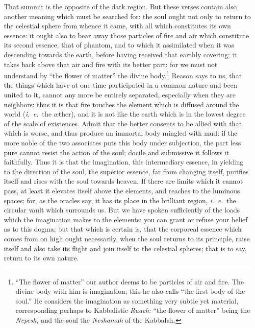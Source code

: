 \documentclass[12pt]{article}
\begin{document}
\noindent That summit is the opposite of the dark region. But these verses
contain also another meaning which must be searched for: the soul ought not
only to return to the celestial sphere from whence it came, with all which
constitutes its own essence: it ought also to bear away those particles of fire
and air which constitute its second essence, that of phantom, and to which it
assimilated when it was descending towards the earth, before having received
that earthly covering; it takes back above that air and fire with its better
part: for we must not understand by ``the flower of matter'' the divine
body.\footnote{\-``The flower of matter'' our author deems to be particles of air
and fire. The divine body with him is imagination; this he also calls ``the
first body of the soul.'' He considers the imagination as something very subtle
yet material, corresponding perhaps to Kabbalistic \textit{Ruach:} ``the flower
of matter'' being the \textit{Nepesh,} and the soul the \textit{Neshamah} of
the Kabbalah.} Reason says to us, that the things which have at one time
participated in a common nature and been united to it, cannot any more be
entirely separated, especially when they are neighbors: thus it is that fire
touches the element which is diffused around the world (\textit{i.~e.}~the
{\ae}ther), and it is not like the earth which is in the lowest degree of the
scale of existences.  Admit that the better consents to be allied with that
which is worse, and thus produce an immortal body mingled with mud: if the more
noble of the two associates puts this body under subjection, the part less pure
cannot resist the action of the soul; docile and submissive it follows it
faithfully. Thus it is that the imagination, this intermediary essence, in
yielding to the direction of the soul, the superior essence, far from changing
itself, purifies itself and rises with the soul towards heaven. If there are
limits which it cannot pass, at least it elevates itself above the elements,
and reaches to the luminous spaces; for, as the oracles say, it has its place
in the brilliant region, \textit{i.~e.}~the circular vault which surrounds us.
But we have spoken sufficiently of the loads which the imagination makes to the
elements: you can grant or refuse your belief as to this dogma; but that which
is certain is, that the corporeal essence which comes from on high ought
necessarily, when the soul returns to its principle, raise itself and also take
its flight and join itself to the celestial spheres; that is to say, return to
its own nature.
\end{document}
